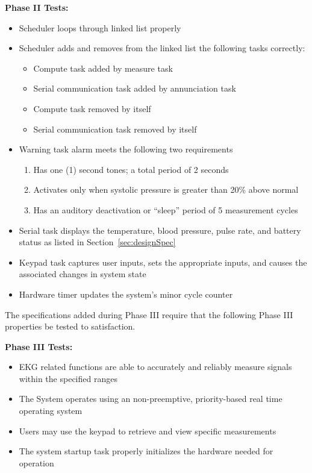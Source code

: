 \documentclass[12pt]{article} %
\begin{document}
    \textbf{Phase II Tests:}
    \begin{itemize}
      \item Scheduler loops through linked list properly
      \item Scheduler adds and removes from the linked list the following tasks
	correctly:
	\begin{itemize}
	  \item Compute task added by measure task
	  \item Serial communication task added by annunciation task
	  \item Compute task removed by itself
	  \item Serial communication task removed by itself
	\end{itemize}
      \item Warning task alarm meets the following two requirements
	\begin{enumerate}
	  \item Has one (1) second tones; a total period of 2 seconds
	  \item Activates only when systolic pressure is greater than 20\% above
	    normal
	  \item Has an auditory deactivation or ``sleep'' period of 5
	    measurement cycles
	\end{enumerate}
	\item Serial task displays the temperature, blood pressure, pulse rate,
	  and battery status as listed in Section~\ref{sec:designSpec}
	\item Keypad task captures user inputs, sets the appropriate inputs,
	  and causes the associated changes in system state
	\item Hardware timer updates the system's minor cycle counter
    \end{itemize}
		
		The specifications added during Phase III require that the following Phase
		III properties be tested to satisfaction.

		\textbf{Phase III Tests:}
		\begin{itemize}
			\item EKG related functions are able to accurately and reliably measure signals within the specified ranges
			\item The System operates using an non-preemptive, priority-based real time operating system
			\item Users may use the keypad to retrieve and view specific measurements
			\item The system startup task properly initializes the hardware needed for operation
		\end{itemize}
\end{document}
